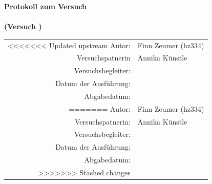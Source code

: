 \begin{titlepage}
\vspace*{2cm} 
  
  \centering
    
  {\LARGE\bfseries Protokoll zum Versuch \\[0.2cm]
  \textit{\versuchsname{\versuchsnummer}} \\[0.5cm] %
  {\large (Versuch {\versuchsnummer})}
  \vspace{1cm}}

  {\large
  \begin{tabular}{@{}rl@{}}
<<<<<<< Updated upstream
    Autor:                  & Finn Zeumer (hz334)\\
    Versuchspatnerin        & Annika Künstle\\[0.5em]
    Versuchsbegleiter:      & {\begleiter{\versuchsnummer}}\\[0.5em]
    Datum der Ausführung:   & {\durchfuehrungsdatum{\versuchsnummer}}\\
    \small{Abgabedatum:}    & \small{\abgabedatum{\versuchsnummer}}\\
=======
    Autor:                & Finn Zeumer (hz334)\\
    Versuchspatnerin:     & Annika Künstle\\[0.5em]
    Versuchsbegleiter:    & {\begleiter{\versuchsnummer}}\\[0.5em]
    Datum der Ausführung: & {\durchfuehrungsdatum{\versuchsnummer}}\\
    \small{Abgabedatum}:  & \small{\abgabedatum{\versuchsnummer}}\\
>>>>>>> Stashed changes
  \end{tabular}
  }
  \vfill



\end{titlepage}
